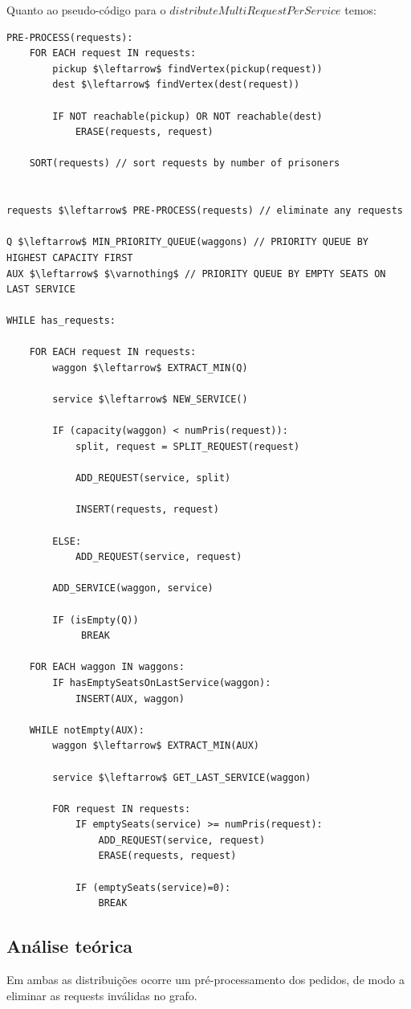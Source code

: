 \documentclass[article, a4paper, 12pt, oneside]{memoir}
\begin{document}
Quanto ao pseudo-código para o $distributeMultiRequestPerService$ temos:\\
\begin{lstlisting}[frame=single, mathescape=true]
PRE-PROCESS(requests):
	FOR EACH request IN requests:
		pickup $\leftarrow$ findVertex(pickup(request))
		dest $\leftarrow$ findVertex(dest(request))
		
		IF NOT reachable(pickup) OR NOT reachable(dest)
			ERASE(requests, request)

	SORT(requests) // sort requests by number of prisoners


requests $\leftarrow$ PRE-PROCESS(requests) // eliminate any requests 

Q $\leftarrow$ MIN_PRIORITY_QUEUE(waggons) // PRIORITY QUEUE BY HIGHEST CAPACITY FIRST
AUX $\leftarrow$ $\varnothing$ // PRIORITY QUEUE BY EMPTY SEATS ON LAST SERVICE

WHILE has_requests:

	FOR EACH request IN requests:
		waggon $\leftarrow$ EXTRACT_MIN(Q)
	
		service $\leftarrow$ NEW_SERVICE()
	
		IF (capacity(waggon) < numPris(request)):
			split, request = SPLIT_REQUEST(request)
		
			ADD_REQUEST(service, split)
		
			INSERT(requests, request)
		
		ELSE:
			ADD_REQUEST(service, request)
		
		ADD_SERVICE(waggon, service)
	
		IF (isEmpty(Q))
			 BREAK
			 
	FOR EACH waggon IN waggons:
		IF hasEmptySeatsOnLastService(waggon):
			INSERT(AUX, waggon)
			
	WHILE notEmpty(AUX):
		waggon $\leftarrow$ EXTRACT_MIN(AUX)
		
		service $\leftarrow$ GET_LAST_SERVICE(waggon)
		
		FOR request IN requests:
			IF emptySeats(service) >= numPris(request):
				ADD_REQUEST(service, request)
				ERASE(requests, request)
		
			IF (emptySeats(service)=0):
				BREAK
\end{lstlisting}

\subsection{Análise teórica}
Em ambas as distribuições ocorre um pré-processamento dos pedidos, de modo a eliminar as requests inválidas no grafo.
\end{document}
